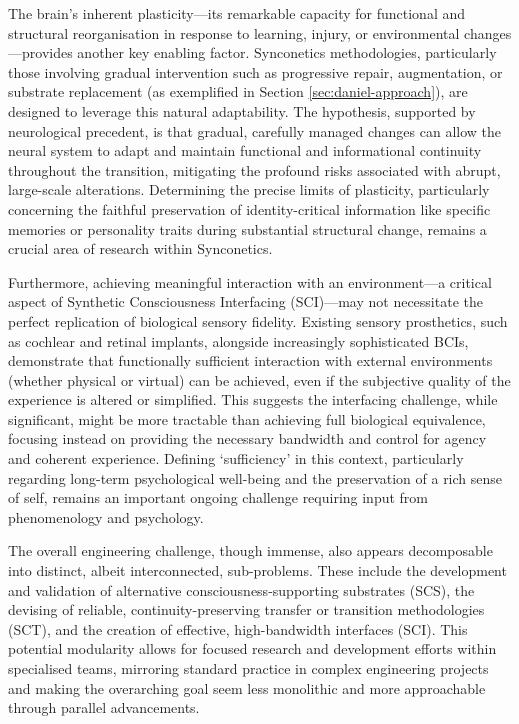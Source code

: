 \documentclass[10pt]{article}
\begin{document}
\begin{sloppypar}
  The brain’s inherent plasticity—its remarkable capacity for functional and structural reorganisation in response to learning, injury, or environmental changes—provides another key enabling factor. Synconetics methodologies, particularly those involving gradual intervention such as progressive repair, augmentation, or substrate replacement (as exemplified in Section \ref{sec:daniel-approach}), are designed to leverage this natural adaptability. The hypothesis, supported by neurological precedent, is that gradual, carefully managed changes can allow the neural system to adapt and maintain functional and informational continuity throughout the transition, mitigating the profound risks associated with abrupt, large-scale alterations. Determining the precise limits of plasticity, particularly concerning the faithful preservation of identity-critical information like specific memories or personality traits during substantial structural change, remains a crucial area of research within Synconetics.

  Furthermore, achieving meaningful interaction with an environment—a critical aspect of Synthetic Consciousness Interfacing (SCI)—may not necessitate the perfect replication of biological sensory fidelity. Existing sensory prosthetics, such as cochlear and retinal implants, alongside increasingly sophisticated BCIs, demonstrate that functionally sufficient interaction with external environments (whether physical or virtual) can be achieved, even if the subjective quality of the experience is altered or simplified. This suggests the interfacing challenge, while significant, might be more tractable than achieving full biological equivalence, focusing instead on providing the necessary bandwidth and control for agency and coherent experience. Defining ‘sufficiency’ in this context, particularly regarding long-term psychological well-being and the preservation of a rich sense of self, remains an important ongoing challenge requiring input from phenomenology and psychology.

  The overall engineering challenge, though immense, also appears decomposable into distinct, albeit interconnected, sub-problems. These include the development and validation of alternative consciousness-supporting substrates (SCS), the devising of reliable, continuity-preserving transfer or transition methodologies (SCT), and the creation of effective, high-bandwidth interfaces (SCI). This potential modularity allows for focused research and development efforts within specialised teams, mirroring standard practice in complex engineering projects and making the overarching goal seem less monolithic and more approachable through parallel advancements.


\end{sloppypar}
\end{document}
